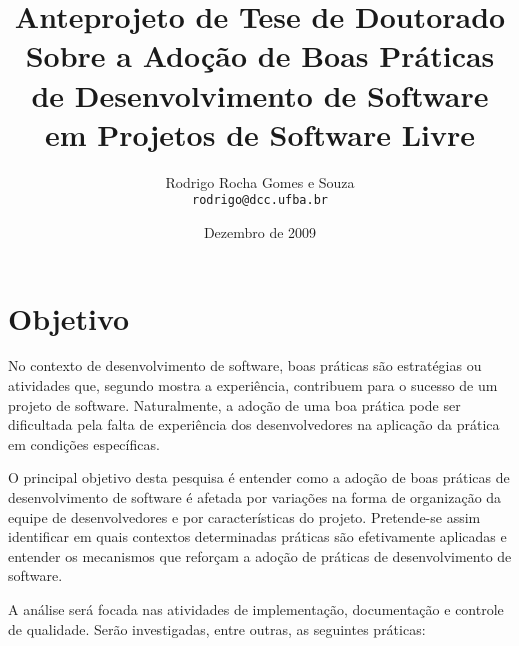 \documentclass{article}
\title{
{\small Anteprojeto de Tese de Doutorado}
\\
Sobre a Adoção de Boas Práticas 
de Desenvolvimento de Software 
em Projetos de Software Livre
%
}
\author{Rodrigo Rocha Gomes e Souza\\
\texttt{rodrigo@dcc.ufba.br}
}
\date{Dezembro de 2009}
\begin{document}
\sloppy
\maketitle





\section{Objetivo}

%

No contexto de desenvolvimento de software, boas práticas são estratégias ou
atividades que, segundo mostra a experiência, contribuem para o sucesso de um
projeto de software.  Naturalmente, a adoção de uma boa prática pode ser
dificultada pela falta de experiência dos desenvolvedores na aplicação da
prática em condições específicas.

O principal objetivo desta pesquisa é entender como a adoção de boas práticas de
desenvolvimento de software é afetada por variações na forma de organização da
equipe de desenvolvedores e por características do projeto. Pretende-se assim
identificar em quais contextos determinadas práticas são efetivamente aplicadas
e entender os mecanismos que reforçam a adoção de práticas de desenvolvimento de
software.

A análise será focada nas atividades de implementação, documentação e controle
de qualidade. Serão investigadas, entre outras, as seguintes práticas:
\end{document}
